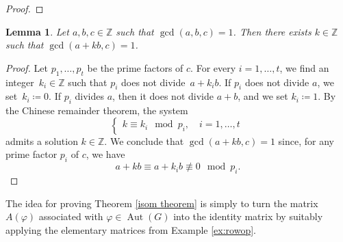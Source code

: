 \documentclass{amsart}
\DeclareMathOperator{\Aut}{Aut}
\newcommand{\Z}{\mathbb{Z}}
\newtheorem{lem}{Lemma}[section]
\theoremstyle{definition}
\begin{document}
\begin{proof}
\end{proof}

\begin{lem}\label{gcd lemma}
    Let $a,b,c\in\Z$ such that $\gcd(a,b,c)=1$. Then there exists $k\in\Z$ such that $\gcd(a+kb,c)=1$.
\end{lem}

\begin{proof}
    Let $p_1,\dots,p_t$ be the prime factors of $c$. For every $i=1,\dots,t$, we find an integer~$k_i\in\Z$ such that $p_i$ does not divide~$a+k_ib$.
    If $p_i$ does not divide $a$, we set~$k_i\coloneqq0$.
    If $p_i$ divides $a$, then it does not divide $a+b$, and we set $k_i\coloneqq 1$.
    By the Chinese remainder theorem, the system
    $$
    \left\{
    \begin{aligned}
    k\equiv k_i \mod p_i, \quad i=1,\dots,t\
    \end{aligned}
    \right.
    $$
    admits a solution $k\in\Z$. We conclude that $\gcd(a+kb,c)=1$ since, for any prime factor $p_i$ of $c$, we have
    $$a+kb\equiv a+k_ib\not\equiv0\mod p_i.$$
\end{proof}

The idea for proving Theorem \ref{isom theorem} is simply to turn the matrix $A(\varphi)$ associated with $\varphi\in\Aut(G)$ into the identity matrix by suitably applying the elementary matrices from Example \ref{ex:rowop}.
\end{document}
